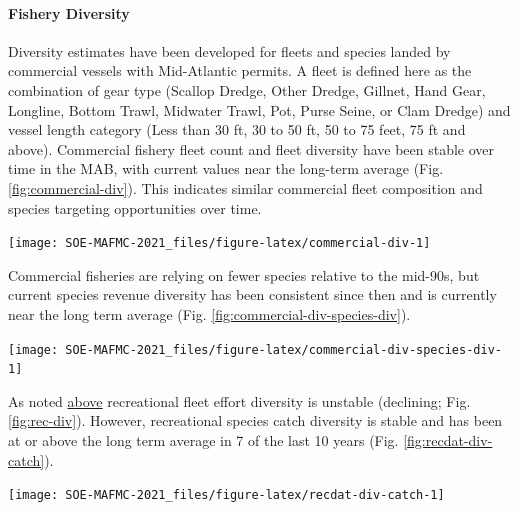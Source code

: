 \documentclass[
  10pt,
]{article}
\let\origfigure\figure
\let\endorigfigure\endfigure
\renewenvironment{figure}[1][2] {
    \expandafter\origfigure\expandafter[H]
} {
    \endorigfigure
}
\begin{document}
\hypertarget{fishery-diversity}{%
\paragraph{Fishery Diversity}\label{fishery-diversity}}

Diversity estimates have been developed for fleets and species landed by
commercial vessels with Mid-Atlantic permits. A fleet is defined here as
the combination of gear type (Scallop Dredge, Other Dredge, Gillnet,
Hand Gear, Longline, Bottom Trawl, Midwater Trawl, Pot, Purse Seine, or
Clam Dredge) and vessel length category (Less than 30 ft, 30 to 50 ft,
50 to 75 feet, 75 ft and above). Commercial fishery fleet count and
fleet diversity have been stable over time in the MAB, with current
values near the long-term average (Fig. \ref{fig:commercial-div}). This
indicates similar commercial fleet composition and species targeting
opportunities over time.

\begin{figure}

{\centering \texttt{[image: SOE-MAFMC-2021\_files/figure-latex/commercial-div-1]} 

}

\caption{Fleet diversity and fleet count in the Mid-Atlantic.}\label{fig:commercial-div}
\end{figure}

Commercial fisheries are relying on fewer species relative to the
mid-90s, but current species revenue diversity has been consistent since
then and is currently near the long term average (Fig.
\ref{fig:commercial-div-species-div}).

\begin{figure}

{\centering \texttt{[image: SOE-MAFMC-2021\_files/figure-latex/commercial-div-species-div-1]} 

}

\caption{Species revenue diversity in the Mid-Atlantic.}\label{fig:commercial-div-species-div}
\end{figure}

As noted \protect\hyperlink{recreational-opportunities}{above}
recreational fleet effort diversity is unstable (declining; Fig.
\ref{fig:rec-div}). However, recreational species catch diversity is
stable and has been at or above the long term average in 7 of the last
10 years (Fig. \ref{fig:recdat-div-catch}).

\begin{figure}

{\centering \texttt{[image: SOE-MAFMC-2021\_files/figure-latex/recdat-div-catch-1]} 

}

\caption{Diversity of recreational catch in the Mid-Atlantic.}\label{fig:recdat-div-catch}
\end{figure}
\end{document}
